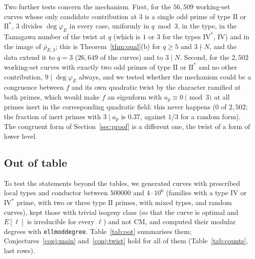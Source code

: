 \documentclass[11pt]{amsart}
\theoremstyle{definition}
\newcommand{\degphi}{\deg\varphi_E}
\begin{document}
Two further tests concern the mechanism. First, for the $56{,}509$ working-set curves whose only candidate contribution at $3$ is a single odd prime of type $\mathrm{II}$ or $\mathrm{II}^*$, $3$ divides $\degphi$ in every case, uniformly in $q\bmod3$, in the type, in the Tamagawa number of the twist at $q$ (which is $1$ or $3$ for the types $\mathrm{IV}^*$, $\mathrm{IV}$) and in the image of $\bar\rho_{E,3}$; this is Theorem~\ref{thm:qual}(b) for $q\ge5$ and $3\nmid N$, and the data extend it to $q=3$ ($26{,}649$ of the curves) and to $3\mid N$. Second, for the $2{,}502$ working-set curves with exactly two odd primes of type $\mathrm{II}$ or $\mathrm{II}^*$ and no other contribution, $9\mid\degphi$ always, and we tested whether the mechanism could be a congruence between $f$ and its own quadratic twist by the character ramified at both primes, which would make $f$ an eigenform with $a_p\equiv0\pmod3$ at all primes inert in the corresponding quadratic field: this never happens ($0$ of $2{,}502$; the fraction of inert primes with $3\mid a_p$ is $0.37$, against $1/3$ for a random form). The congruent form of Section~\ref{sec:proof} is a different one, the twist of a form of lower level.

\subsection{Out of table}
To test the statements beyond the tables, we generated curves with prescribed local types and conductor between $500000$ and $4\cdot10^6$ (families with a type $\mathrm{IV}$ or $\mathrm{IV}^*$ prime, with two or three type $\mathrm{II}$ primes, with mixed types, and random curves), kept those with trivial isogeny class (so that the curve is optimal and $E[\ell]$ is irreducible for every $\ell$) and not CM, and computed their modular degrees with \texttt{ellmoddegree}. Table~\ref{tab:oot} summarises them; Conjectures~\ref{conj:main} and~\ref{conj:twist} hold for all of them (Table~\ref{tab:counts}, last rows).

\begin{table}[ht]
\centering\small

\caption{Curves outside the tables, with modular degrees computed independently.}\label{tab:oot}
\end{table}
\end{document}
